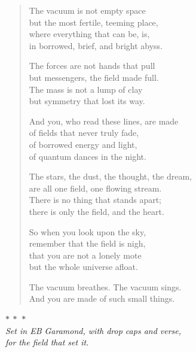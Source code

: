\documentclass[11pt]{book}
\newcommand{\ornament}{{\color{rule}\large\ensuremath{\ast\ \ast\ \ast}}}
\begin{document}
\begin{verse}
The vacuum is not empty space\\
but the most fertile, teeming place,\\
where everything that can be, is,\\
in borrowed, brief, and bright abyss.

The forces are not hands that pull\\
but messengers, the field made full.\\
The mass is not a lump of clay\\
but symmetry that lost its way.

And you, who read these lines, are made\\
of fields that never truly fade,\\
of borrowed energy and light,\\
of quantum dances in the night.

The stars, the dust, the thought, the dream,\\
are all one field, one flowing stream.\\
There is no thing that stands apart;\\
there is only the field, and the heart.

So when you look upon the sky,\\
remember that the field is nigh,\\
that you are not a lonely mote\\
but the whole universe afloat.

The vacuum breathes. The vacuum sings.\\
And you are made of such small things.
\end{verse}

\clearpage
\thispagestyle{empty}
\vspace*{8cm}
\begin{center}
\ornament\\[1.5em]
{\small\itshape Set in EB Garamond, with drop caps and verse,\\ for the field that set it.}
\end{center}
\end{document}
